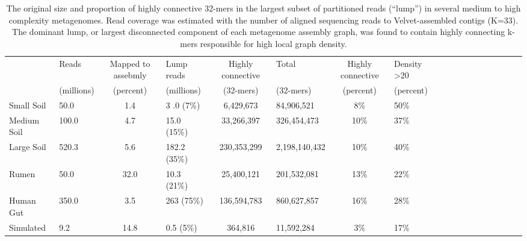 \documentclass[10pt]{article}
\begin{document}



\pagebreak

\begin{landscape}
\begin{table}[ht]
\centering
\caption{The original size and proportion of highly connective 32-mers in the largest subset of partitioned reads (``lump'') in several medium to high complexity metagenomes.  Read coverage was estimated with the number of aligned sequencing reads to Velvet-assembled contigs (K=33).  The dominant lump, or largest disconnected component of each metagenome assembly graph, was found to contain highly connecting k-mers responsible for high local graph density.}
\begin{tabular}{lp{2cm}cp{2cm}cp{2cm}cp{2cm}cp{2cm}cp{2cm}cp{2cm}cp{2cm}cp{2cm}|}
\hline
& Reads	& Mapped to assebmly	& Lump reads	& Highly connective & Total & Highly connective  & Density \textgreater 20  \\
& (millions) & (percent) & (millions) & (32-mers) & (32-mers) & (percent) & (percent) \\

\hline
Small Soil 	& 50.0 	& 1.4 	& 3 .0 (7\%)	& 6,429,673 	& 84,906,521 	& 8\% 	& 50\% \\
Medium Soil 	& 100.0 	& 4.7 	& 15.0 (15\%)	& 33,266,397 	& 326,454,473 & 10\% 	& 37\% \\ 
Large Soil	 	& 520.3 	& 5.6 	& 182.2 (35\%)	& 230,353,299 & 2,198,140,432 & 10\% 	& 40\% \\
Rumen 		& 50.0 	& 32.0 	& 10.3 (21\%)	& 25,400,121 	& 201,532,081 	& 13\% 	& 22\% \\
Human Gut 	& 350.0	& 3.5 	& 263 (75\%) 	& 136,594,783	 & 860,627,857 & 16\% 	& 28\% \\
Simulated		& 9.2		 & 14.8 	& 0.5 (5\%) 	& 364,816 	& 11,592,284 	& 3\% 	& 17\% \\
\hline
\end{tabular}
\end{table}
\end{landscape}
\end{document}
